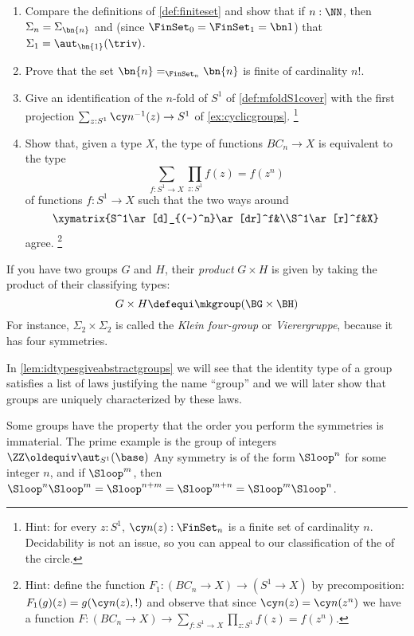 \begin{xca}
  \label{xca:somedetailsonfinitegroupstocheck}
  \begin{enumerate}
  \item Compare the definitions of \cref{def:finiteset} and show that if $n:\NN$, then $\Sigma_n=\Sigma_{\bn{n} }$
and (since $\FinSet_0=\FinSet_1=\bn 1$) that $\Sigma_{1}=\aut_{\bn{1} }(\triv)$.
\item Prove that the set $\bn{n} =_{\FinSet_n}\bn{n} $ is finite of cardinality $n!$.
\item Give an identification of the $n$-fold \covering of $S^1$ of \cref{def:mfoldS1cover} with the first projection $\sum_{z:S^1}\cy n^{-1}(z)\to S^1$ of \cref{ex:cyclicgroups}.%
\footnote{Hint: for every $z:S^1$, $\cy n(z):\FinSet_n$ is a finite set of cardinality $n$.
Decidability is not an issue, so you can appeal to our classification of the \coverings of the circle.}
\item Show that, given a type $X$, the type of functions $BC_n\to X$ is equivalent to the type
$$\sum_{f:S^1\to X}\prod_{z:S^1}f(z)=f(z^n)$$ of functions $f:S^1\to X$ such that the two ways around
$$\xymatrix{S^1\ar[d]_{(-)^n}\ar[dr]^f&\\S^1\ar[r]^f&X}$$
agree. \footnote{Hint: define the function $F_1:(BC_n\to X)\to (S^1\to X)$ by precomposition:
$F_1(g)(z)=g(\cy n(z),!)$ and observe that since $\cy n(z)=\cy n(z^n)$ we have a
function $F:(BC_n\to X)\to \sum_{f:S^1\to X}\prod_{z:S^1}f(z)=f(z^n)$.}
\end{enumerate}
\end{xca}


\begin{example}\label{ex:productofgroups}
  If you have two groups $G$ and $H$, their \emph{product} $G\times H$ is given by taking the product of their classifying types:
  \[
    G\times H\defequi \mkgroup(\BG\times\BH)
  \]
  For instance, $\Sigma_2\times\Sigma_2$ is called the
  \emph{Klein four-group} or \emph{Vierergruppe}, because
    it has four symmetries.
  \end{example}

\begin{remark}
In \cref{lem:idtypesgiveabstractgroups} we will see that the identity type of a group satisfies a list of laws justifying the name ``group''
and we will later show that groups are uniquely characterized by these laws.
\end{remark}
Some groups have the property that the order you perform the symmetries is immaterial.  The prime example is the group of integers $\ZZ\oldequiv \aut_{S^1}(\base)$  Any symmetry is of the form $\Sloop^n$ for some integer $n$, and if $\Sloop^m$, then $\Sloop^n\Sloop^m=\Sloop^{n+m}=\Sloop^{m+n}=\Sloop^m\Sloop^n$.

